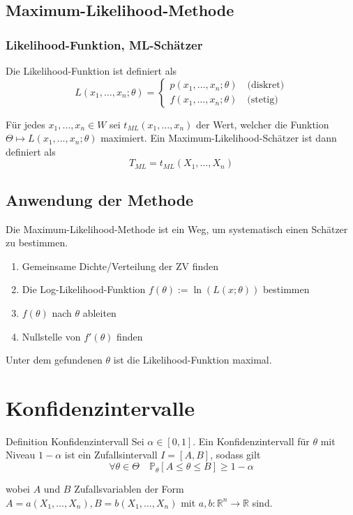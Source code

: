 \documentclass[a4paper,10pt]{article}
\def\R{\mathbb{R}}
\def\P{\mathbb{P}}
\begin{document}
\subsection{Maximum-Likelihood-Methode}
\subsubsection{Likelihood-Funktion, ML-Schätzer}
Die Likelihood-Funktion ist definiert als
\[L(x_1, \ldots, x_n; \theta) = \begin{cases}
        p(x_1, \ldots, x_n; \theta) \quad \text{(diskret)} \\
        f(x_1, \ldots, x_n; \theta) \quad \text{(stetig)}
    \end{cases} \]

\noindent Für jedes \(x_1, \ldots, x_n \in W\) sei \(t_{ML}(x_1, \ldots, x_n)\) der Wert, welcher die Funktion \(\Theta \mapsto L(x_1, \ldots, x_n; \theta)\) maximiert. Ein Maximum-Likelihood-Schätzer ist dann definiert als
\[T_{ML} = t_{ML}(X_1, \ldots, X_n)\]

\subsection{Anwendung der Methode}
Die Maximum-Likelihood-Methode ist ein Weg, um systematisch einen Schätzer zu bestimmen.
\begin{enumerate}
    \item Gemeinsame Dichte/Verteilung der ZV finden
    \item Die Log-Likelihood-Funktion \(f(\theta) := \ln(L(x;\theta))\) bestimmen
    \item \(f(\theta)\) nach \(\theta\) ableiten
    \item Nullstelle von \(f'(\theta)\) finden
\end{enumerate}
Unter dem gefundenen \(\theta\) ist die Likelihood-Funktion maximal.

\section{Konfidenzintervalle}
\begin{mainbox}{Definition Konfidenzintervall}
    Sei \(\alpha \in [0,1]\). Ein Konfidenzintervall für \(\theta\) mit Niveau \(1 - \alpha\) ist ein Zufallsintervall \(I=[A,B]\), sodass gilt
    \[\forall \theta \in \Theta \quad \P_\theta[A\le \theta \le B] \ge 1- \alpha\]

    wobei \(A\) und \(B\) Zufallsvariablen der Form \(A = a(X_1, \ldots, X_n), B = b(X_1, \ldots, X_n)\) mit \(a,b: \R^n \to \R\) sind.
\end{mainbox}
\end{document}
